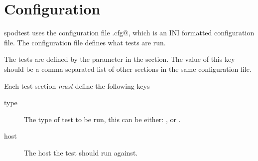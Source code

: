 \section{Configuration}
\gls{spodtest} uses the configuration file \verb@spodconf.cfg@, which is an INI
formatted configuration file. The configuration file defines what tests are
run.

The tests are defined by the \verb@tests@ parameter in the \verb@spod@ section.
The value of this key should be a comma separated list of other sections in the
same configuration file. 

Each test section \textit{must} define the following keys

\begin{description}
    \item[type] The type of test to be run, this can be either: \verb@scp@,
        \verb@sftp@ or \verb@rsync@.
    \item[host] The host the test should run against.
\end{description}
